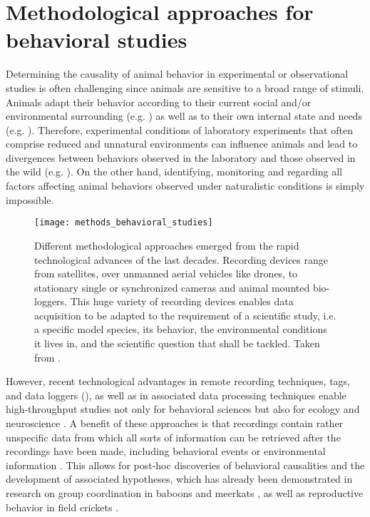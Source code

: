 \section{Methodological approaches for behavioral studies}

Determining the causality of animal behavior in experimental or observational studies is often challenging since animals are sensitive to a broad range of stimuli. Animals adapt their behavior according to their current social and/or environmental surrounding (e.g. \citealp{Chapman1995, Sapolsky2005, Markham2015}) as well as to their own internal state and needs (e.g. \citealp{Boon2007}). Therefore, experimental conditions of laboratory experiments that often comprise reduced and unnatural environments can influence animals and lead to divergences between behaviors observed in the laboratory and those observed in the wild (e.g. \citealp{Cheney1995, Rendall1999, Henninger2018}). On the other hand, identifying, monitoring and regarding all factors affecting animal behaviors observed under naturalistic conditions is simply impossible.

\begin{figure}[h!]
  \centerline{\texttt{[image: methods\_behavioral\_studies]}}
  \caption{\label{methods_hebavioral_studies} Different methodological approaches emerged from the rapid technological advances of the last decades. Recording devices range from satellites, over unmanned aerial vehicles like drones, to stationary single or synchronized cameras and animal mounted bio-loggers. This huge variety of recording devices enables data acquisition to be adapted to the requirement of a scientific study, i.e. a specific model species, its behavior, the environmental conditions it lives in, and the scientific question that shall be tackled. Taken from \citet{Hughey2018}.}
\end{figure}

However, recent technological advantages in remote recording techniques, tags, and data loggers (), as well as in associated data processing techniques enable high-throughput studies not only for behavioral sciences but also for ecology and neuroscience \citep{Anderson2014, Dell2014, Hughey2018, Mathis2018}. A benefit of these approaches is that recordings contain rather unspecific data from which all sorts of information can be retrieved after the recordings have been made, including behavioral events or environmental information \citep{Gomez2014}. This allows for post-hoc discoveries of behavioral causalities and the development of associated hypotheses, which has already been demonstrated in research on group coordination in baboons \citep{Strandburg2015} and meerkats \citep{StrandburgPeshkin2019}, as well as reproductive behavior in field crickets \citep{Rodriguez2010}. 


